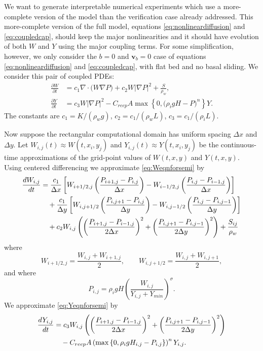\documentclass[11pt]{amsart}
\newcommand{\Hij}{H_{i,j}}
\newcommand{\Pij}{P_{i,j}}
\newcommand{\Wij}{W_{i,j}}
\newcommand{\Yij}{Y_{i,j}}
\newcommand{\bv}{\mathbf{v}}
\newcommand{\Creep}{C_{reep}}
\begin{document}
We want to generate interpretable numerical experiments which use a more-complete version of the model than the verification case already addressed.  This more-complete version of the full model, equations \eqref{eq:nonlineardiffusion} and \eqref{eq:coupledcap}, should keep the major nonlinearities and it should have evolution of both $W$ and $Y$ using the major coupling terms.  For some simplification, however, we only consider the $b=0$ and $\bv_b=0$ case of equations \eqref{eq:nonlineardiffusion} and \eqref{eq:coupledcap}, with flat bed and no basal sliding.  We consider this pair of coupled PDEs:
\begin{align}
\frac{\partial W}{\partial t} &= c_1 \nabla \cdot \big(W \nabla P\big) + c_2 W \left|\nabla P\right|^2 + \frac{S}{\rho_w},  \label{eq:Weqnforsemi} \\
\frac{\partial Y}{\partial t} &= c_3 W \left|\nabla P\right|^2 - \Creep A \max\left\{0,\big(\rho_i g H - P\big)^n\right\} Y. \label{eq:Yeqnforsemi}
\end{align}
The constants are $c_1=K/(\rho_w g)$, $c_2 = c_1 / (\rho_w L)$, $c_3 = c_1 / (\rho_i L)$.

Now suppose the rectangular computational domain has uniform spacing $\Delta x$ and $\Delta y$.  Let $\Wij(t) \approx W(t,x_i,y_j)$ and $\Yij(t) \approx Y(t,x_i,y_j)$ be the continuous-time approximations of the grid-point values of $W(t,x,y)$ and $Y(t,x,y)$.  Using centered differencing \citep{MortonMayers} we approximate \eqref{eq:Weqnforsemi} by
\begin{align} \label{eq:Weqnfd}
  \frac{d \Wij}{dt}  &= \frac{c_1}{\Delta x} \left[W_{i+1/2,j} \left(\frac{P_{i+1,j} - \Pij}{\Delta x}\right) - W_{i-1/2,j} \left(\frac{\Pij - P_{i-1,j}}{\Delta x}\right)\right] \\
     &\quad + \frac{c_1}{\Delta y} \left[W_{i,j+1/2} \left(\frac{P_{i,j+1} - \Pij}{\Delta y}\right) - W_{i,j-1/2} \left(\frac{\Pij - P_{i,j-1}}{\Delta y}\right)\right] \notag \\
     &\quad + c_2 \Wij \left(\left(\frac{P_{i+1,j} - P_{i-1,j}}{2\Delta x}\right)^2 + \left(\frac{P_{i,j+1} - P_{i,j-1}}{2\Delta y}\right)^2\right) + \frac{S_{ij}}{\rho_w} \notag
\end{align}
where
\begin{equation*}
W_{i+1/2,j} = \frac{\Wij+W_{i+1,j}}{2}, \qquad W_{i,j+1/2} = \frac{\Wij+W_{i,j+1}}{2},
\end{equation*}
and where
   $$\Pij = \rho_i g H \left(\frac{\Wij}{\Yij + Y_{min}}\right)^\sigma.$$
We approximate \eqref{eq:Yeqnforsemi} by
\begin{align} \label{eq:Yeqnfd}
  \frac{d \Yij}{dt}  &= c_3 \Wij \left(\left(\frac{P_{i+1,j} - P_{i-1,j}}{2\Delta x}\right)^2 + \left(\frac{P_{i,j+1} - P_{i,j-1}}{2\Delta y}\right)^2\right) \\
     &\quad - \Creep A \left(\max\left\{0,\rho_i g \Hij - \Pij\right\}\right)^n \Yij. \notag
\end{align}
\end{document}
